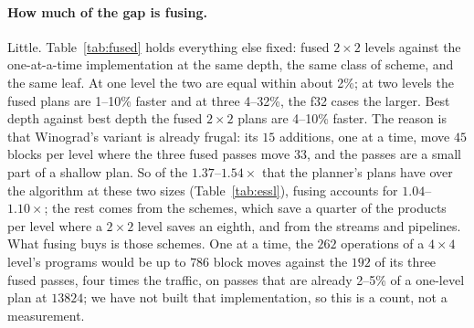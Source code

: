\documentclass[11pt]{article}
\begin{document}
\paragraph{How much of the gap is fusing.}
Little.  Table~\ref{tab:fused} holds everything else fixed: fused $2\times2$
levels against the one-at-a-time implementation at the same depth, the same
class of scheme, and the same leaf.  At one level the two are equal within
about 2\%; at two levels the fused plans are 1--10\% faster and at three
4--32\%, the f32 cases the larger.  Best depth against best depth the fused
$2\times2$ plans are 4--10\% faster.  The reason is that Winograd's variant
is already frugal: its $15$ additions, one at a time, move $45$ blocks per
level where the three fused passes move $33$, and the passes are a small
part of a shallow plan.  So of the $1.37$--$1.54\times$ that the planner's
plans have over the algorithm at these two sizes (Table~\ref{tab:essl}),
fusing accounts for $1.04$--$1.10\times$; the rest comes from the schemes,
which save a quarter of the products per level where a $2\times2$ level saves
an eighth, and from the streams and pipelines.  What fusing buys is those
schemes.  One at a time, the $262$ operations of a $4\times4$ level's
programs would be up to $786$ block moves against the $192$ of its three
fused passes, four times the traffic, on passes that are already 2--5\% of
a one-level plan at $13824$; we have not built that implementation, so this
is a count, not a measurement.
\end{document}
